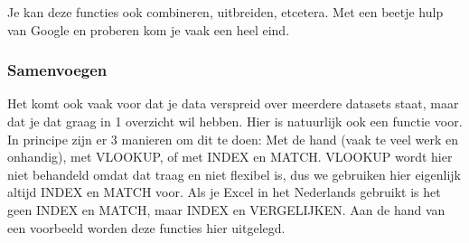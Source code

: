 Je kan deze functies ook combineren, uitbreiden, etcetera. Met een beetje hulp van Google en proberen kom je vaak een heel eind. 

\subsubsection*{Samenvoegen}
Het komt ook vaak voor dat je data verspreid over meerdere datasets staat, maar dat je dat graag in 1 overzicht wil hebben. Hier is natuurlijk ook een functie voor. In principe zijn er 3 manieren om dit te doen: Met de hand (vaak te veel werk en onhandig), met VLOOKUP, of met INDEX en MATCH. VLOOKUP wordt hier niet behandeld omdat dat traag en niet flexibel is, dus we gebruiken hier eigenlijk altijd INDEX en MATCH voor. Als je Excel in het Nederlands gebruikt is het geen INDEX en MATCH, maar INDEX en VERGELIJKEN. Aan de hand van een voorbeeld worden deze functies hier uitgelegd.


